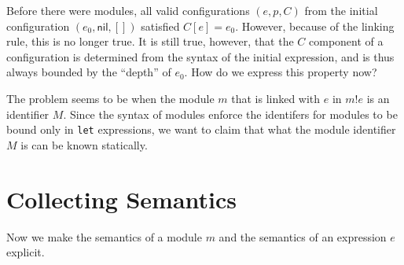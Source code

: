 \documentclass{article}
\newcommand*{\link}[2]{{#1}\mathtt{!}{#2}}
\newcommand*{\IndexMod}{\mathsf{index\_mod}}
\newcommand*{\Pop}{\mathsf{pop}}
\begin{document}
\begin{prooftree*}
\end{prooftree*}

\begin{prooftree*}
  \hypo{\mathsf{Some}\:i=\IndexMod(C,M)}
  \hypo{\mathsf{Some}\:p_{M}=\Pop^{i}(p)}
\end{prooftree*}

\begin{prooftree*}
\end{prooftree*}

\begin{prooftree*}
\end{prooftree*}

Before there were modules, all valid configurations $(e, p, C)$ from the initial configuration $(e_{0}, \mathsf{nil}, [])$ satisfied $C[e]=e_{0}$.
However, because of the linking rule, this is no longer true.
It is still true, however, that the $C$ component of a configuration is determined from the syntax of the initial expression, and is thus always bounded by the ``depth'' of $e_{0}$.
How do we express this property now?

The problem seems to be when the module $m$ that is linked with $e$ in $\link{m}{e}$ is an identifier $M$.
Since the syntax of modules enforce the identifers for modules to be bound only in \texttt{let} expressions, we want to claim that what the module identifier $M$ is can be known statically.

\section{Collecting Semantics}

Now we make the semantics of a module $m$ and the semantics of an expression $e$ explicit.

\printbibliography
\end{document}
